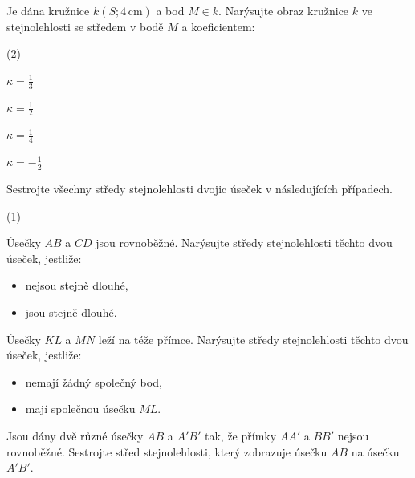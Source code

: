 \documentclass[12pt,a4paper]{article}
\begin{document}

\begin{exercise}

    Je dána kružnice $k(S;4\,\mathrm{cm})$ a bod $M\in k$.
    Narýsujte obraz kružnice $k$ ve stejnolehlosti se středem v bodě $M$ a koeficientem:

    \begin{tasks}(2)

        \task $\kappa=\tfrac13$

        \task $\kappa=\tfrac12$

        \task $\kappa=\tfrac14$

        \task $\kappa=-\tfrac12$

    \end{tasks}

\end{exercise}



\setcounter{section}{2}

\begin{exercise}

    Sestrojte všechny středy stejnolehlosti dvojic úseček v následujících případech.

    \begin{tasks}(1)

        \task Úsečky $AB$ a $CD$ jsou rovnoběžné. Narýsujte středy stejnolehlosti těchto dvou úseček, jestliže:
        \begin{itemize}
            \item[a)] nejsou stejně dlouhé,
            \item[b)] jsou stejně dlouhé.
        \end{itemize}

        \task Úsečky $KL$ a $MN$ leží na téže přímce. Narýsujte středy stejnolehlosti těchto dvou úseček, jestliže:
        \begin{itemize}
            \item[a)] nemají žádný společný bod,
            \item[b)] mají společnou úsečku $ML$.
        \end{itemize}

        \task Jsou dány dvě různé úsečky $AB$ a $A'B'$ tak, že přímky $AA'$ a $BB'$ nejsou rovnoběžné. Sestrojte střed stejnolehlosti, který zobrazuje úsečku $AB$ na úsečku $A'B'$.

    \end{tasks}

\end{exercise}
\end{document}
